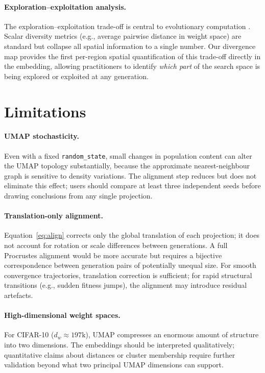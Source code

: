 \documentclass{article}
\begin{document}
\paragraph{Exploration--exploitation analysis.}
The exploration--exploitation trade-off is central to evolutionary
computation \citep{eiben2003introduction}.
Scalar diversity metrics (e.g., average pairwise distance in weight space) are
standard but collapse all spatial information to a single number.
Our divergence map provides the first per-region spatial quantification of this
trade-off directly in the embedding, allowing practitioners to identify
\emph{which part} of the search space is being explored or exploited at any
generation.


\section{Limitations}
\label{sec:limits}

\paragraph{UMAP stochasticity.}
Even with a fixed \texttt{random\_state}, small changes in population content
can alter the UMAP topology substantially, because the approximate
nearest-neighbour graph is sensitive to density variations.
The alignment step reduces but does not eliminate this effect; users should
compare at least three independent seeds before drawing conclusions from any
single projection.

\paragraph{Translation-only alignment.}
Equation~\eqref{eq:align} corrects only the global translation of each
projection; it does not account for rotation or scale differences between
generations.
A full Procrustes alignment \citep{gower1975procrustes} would be more accurate
but requires a bijective correspondence between generation pairs of potentially
unequal size.
For smooth convergence trajectories, translation correction is sufficient; for
rapid structural transitions (e.g., sudden fitness jumps), the alignment may
introduce residual artefacts.

\paragraph{High-dimensional weight spaces.}
For CIFAR-10 ($d_w \approx 197\text{k}$), UMAP compresses an enormous amount
of structure into two dimensions.
The embeddings should be interpreted qualitatively; quantitative claims about
distances or cluster membership require further validation beyond what two
principal UMAP dimensions can support.
\end{document}
